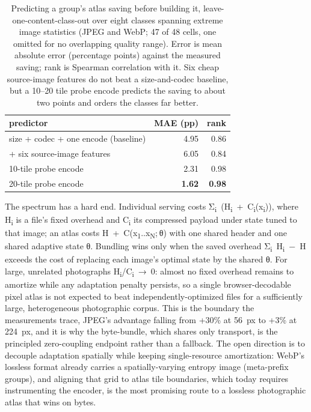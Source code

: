 \documentclass[3p,twocolumn]{elsarticle}
\begin{document}
\begin{table}[t]
\centering
\small
\setlength{\tabcolsep}{4pt}
\begin{tabular}{@{}l rr@{}}
\toprule
predictor & MAE (pp) & rank \\
\midrule
size + codec + one encode (baseline) & 4.95 & 0.86 \\
\quad + six source-image features & 6.05 & 0.84 \\
10-tile probe encode & 2.31 & 0.98 \\
20-tile probe encode & \textbf{1.62} & \textbf{0.98} \\
\bottomrule
\end{tabular}
\caption{Predicting a group's atlas saving
before building it, leave-one-content-class-out over eight classes
spanning extreme image statistics (JPEG and WebP; 47 of 48 cells, one
omitted for no overlapping quality range). Error is mean absolute error
(percentage points) against the measured saving; rank is Spearman
correlation with it. Six cheap source-image features do not beat a
size-and-codec baseline, but a 10--20 tile probe encode predicts the
saving to about two points and orders the classes far better.}

\end{table}


The spectrum has a hard end. Individual serving costs
Σ\textsubscript{i}~(H\textsubscript{i}~+~C\textsubscript{i}(x\textsubscript{i})),
where H\textsubscript{i} is a file's fixed overhead and
C\textsubscript{i} its compressed payload under state tuned to that
image; an atlas costs H~+~C(x\textsubscript{1}..x\textsubscript{N}; θ)
with one shared header and one shared adaptive state θ. Bundling wins
only when the saved overhead Σ\textsubscript{i}~H\textsubscript{i}~−~H
exceeds the cost of replacing each image's optimal state
by the shared θ. For large, unrelated photographs
H\textsubscript{i}/C\textsubscript{i}~→~0: almost no fixed overhead
remains to amortize while any adaptation penalty persists, so a single
browser-decodable pixel atlas is not expected to beat
independently-optimized files for a sufficiently large, heterogeneous
photographic corpus. This is the boundary the measurements trace,
JPEG's advantage falling from +30\% at 56~px to +3\% at
224~px, and it is why the byte-bundle, which shares only transport, is
the principled zero-coupling endpoint rather than a fallback. The open
direction is to decouple adaptation spatially while keeping
single-resource amortization: WebP's lossless format
already carries a spatially-varying entropy image (meta-prefix groups),
and aligning that grid to atlas tile boundaries, which today requires
instrumenting the encoder, is the most promising route to a lossless
photographic atlas that wins on bytes.
\end{document}
